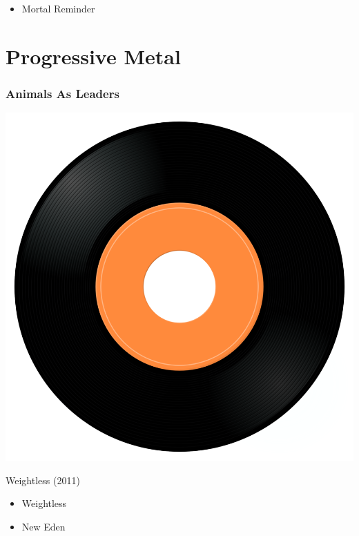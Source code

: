 \begin{minipage}[t]{0.25\textwidth}\vspace{0pt}
\begin{itemize}[nosep,leftmargin=1em,labelwidth=*,align=left]
	\setlength{\itemsep}{0pt}
	\item Mortal Reminder
\end{itemize}
\end{minipage}


\section{Progressive Metal}

\subsubsection{Animals As Leaders}

\begin{minipage}[t]{0.25\textwidth}
\captionsetup{type=figure}
\includegraphics[width=\textwidth]{Images/cover.png}
\caption*{Weightless (2011)}
\end{minipage}
\begin{minipage}[t]{0.25\textwidth}\vspace{0pt}
\begin{itemize}[nosep,leftmargin=1em,labelwidth=*,align=left]
	\setlength{\itemsep}{0pt}
	\item Weightless
	\item New Eden
\end{itemize}
\end{minipage}

